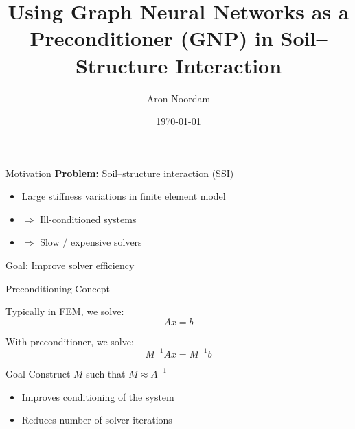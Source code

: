 \documentclass[aspectratio=169]{beamer}
\title{ Using Graph Neural Networks as a Preconditioner (GNP) in Soil–Structure Interaction}
\subtitle{}
\author{
    Aron Noordam
    }
\date{\today}
\begin{document}
\begin{frame}[plain]{}
\titlepage
\end{frame}

\begin{frame}{Motivation}
	\textbf{Problem:} Soil--structure interaction (SSI)
	
	\medskip
	
	\begin{itemize}
		\item Large stiffness variations in finite element model
		\item $\Rightarrow$ Ill-conditioned systems
		\item $\Rightarrow$ Slow / expensive solvers
	\end{itemize}
	
	\medskip
	
	\alert{Goal: Improve solver efficiency}
\end{frame}



\begin{frame}{Preconditioning Concept}
	
	Typically in FEM, we solve:
	\[
	Ax = b
	\]
	
	\medskip
	
	With preconditioner, we solve:
	\[
	M^{-1}Ax = M^{-1}b
	\]
	
	\medskip
	
	\begin{block}{Goal}
		Construct $M$ such that $M \approx A^{-1}$
	\end{block}
	
	\medskip
	
	\begin{itemize}
		\item Improves conditioning of the system
		\item Reduces number of solver iterations
	\end{itemize}
\end{frame}

\end{document}
